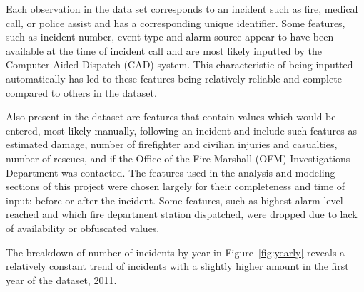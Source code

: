 \documentclass[12pt,letterpaper, oneside]
{article}
\begin{document}
Each observation in the data set corresponds to an incident such as fire, medical call, or police assist and has a corresponding unique identifier. Some features, such as incident number, event type and alarm source appear to have been available at the time of incident call and are most likely inputted by the Computer Aided Dispatch (CAD) system. This characteristic of being inputted automatically has led to these features being relatively reliable and complete compared to others in the dataset. 

Also present in the dataset are features that contain values which would be entered, most likely manually, following an incident and include such features as estimated damage, number of firefighter and civilian injuries and casualties, number of rescues, and if the Office of the Fire Marshall (OFM) Investigations Department was contacted. The features used in the analysis and modeling sections of this project were chosen largely for their completeness and time of input: before or after the incident. Some features, such as highest alarm level reached and which fire department station dispatched, were dropped due to lack of availability or obfuscated values. 

The breakdown of number of incidents by year in Figure~\ref{fig:yearly} reveals a relatively constant trend of incidents with a slightly higher amount in the first year of the dataset, 2011. 
\end{document}
